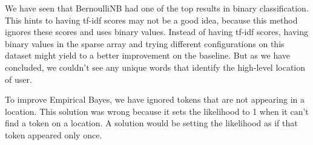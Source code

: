 \documentclass[twoside,11pt]{article}
\begin{document}
We have seen that BernoulliNB had one of the top results in binary classification. This hints to having tf-idf scores may not be a good idea, because this method ignores these scores and uses binary values. Instead of having tf-idf scores, having binary values in the sparse array and trying different configurations on this dataset might yield to a better improvement on the baseline. But as we have concluded, we couldn't see any unique words that identify the high-level location of user.

To improve Empirical Bayes, we have ignored tokens that are not appearing in a location. This solution was wrong because it sets the likelihood to 1 when it can't find a token on a location. A solution would be setting the likelihood as if that token appeared only once.


\end{document}
